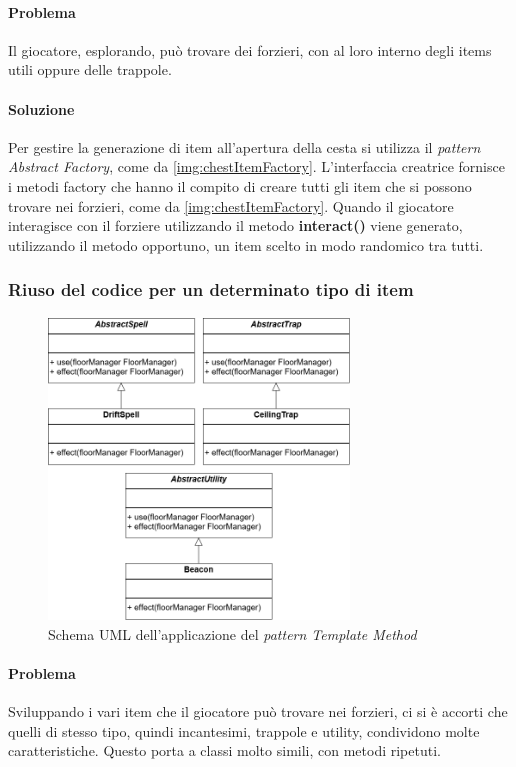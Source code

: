 \documentclass{report}
\begin{document}
\paragraph{Problema} Il giocatore, esplorando, può trovare dei forzieri, con al loro interno degli items utili oppure delle trappole. 

\paragraph{Soluzione} Per gestire la generazione di item all'apertura della cesta si utilizza il \textit{pattern Abstract Factory}, come da \ref{img:chestItemFactory}.
%
L'interfaccia creatrice fornisce i metodi factory che hanno il compito di creare tutti gli item che si possono trovare nei forzieri, come da \ref{img:chestItemFactory}. 
%
Quando il giocatore interagisce con il forziere utilizzando il metodo \textbf{interact()} viene generato, utilizzando il metodo opportuno, un item scelto in modo randomico tra tutti.

\subsubsection{Riuso del codice per un determinato tipo di item}

\begin{figure}
    \centering
    \includegraphics[width=8cm]{patternTemplateItem.drawio.png}
    \caption{Schema UML dell'applicazione del \textit{pattern Template Method}}
    \label{img:templateItem}
\end{figure}

\paragraph{Problema} Sviluppando i vari item che il giocatore può trovare nei forzieri, ci si è accorti che quelli di stesso tipo, quindi incantesimi, trappole e utility, condividono molte caratteristiche.
%
Questo porta a classi molto simili, con metodi ripetuti. 
\end{document}
